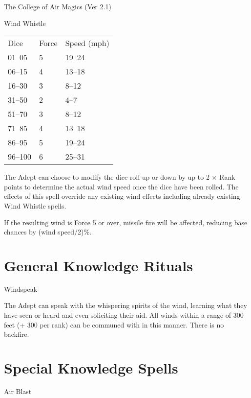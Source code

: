 \begin{Chapter}{The College of Air Magics (Ver 2.1)}
\begin{spell}[G-9]{Wind Whistle}
\begin{effects}
\begin{tabularx}{\columnwidth}{XXX}
Dice	& Force	& Speed (mph) \\
01–05	& 5	& 19–24 \\
06–15	& 4	& 13–18 \\
16–30	& 3	& 8–12	\\
31–50	& 2	& 4–7	\\
51–70	& 3	& 8–12	\\
71–85	& 4	& 13–18	\\
86–95	& 5	& 19–24	\\
96–100	& 6	& 25–31	\\
\end{tabularx}

The Adept can choose to modify the dice roll up or down by up to 2 ×
Rank points to determine the actual wind speed once the dice have been
rolled.  The effects of this spell override any existing wind effects
including already existing Wind Whistle spells.

If the resulting wind is Force 5 or over, missile fire will be
affected, reducing base chances by (wind speed/2)\%.
\end{effects}
\end{spell}


\section{General Knowledge Rituals}

\begin{ritual}[Q-1]{Windspeak}

\begin{effects}
The Adept can speak with the whispering spirits of the wind, learning
what they have seen or heard and even soliciting their aid.  All winds
within a range of 300 feet (+ 300 per rank) can be communed with in
this manner.  There is no backfire.
\end{effects}
\end{ritual}

\section{Special Knowledge Spells}

\begin{spell}[S-1]{Air Blast}


\end{spell}
\end{Chapter}
